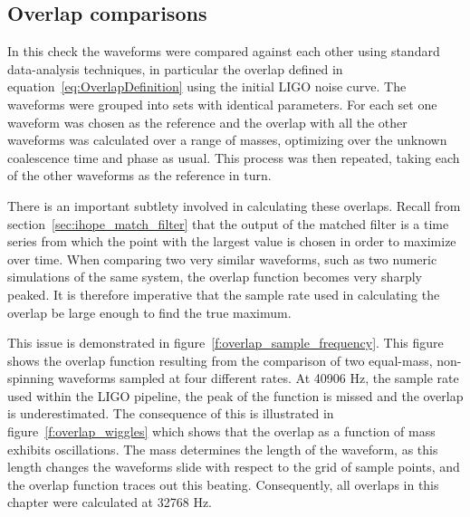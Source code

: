 \subsection{Overlap comparisons}
\label{ssec:ninja2_overlap_comparisons}

In this check the waveforms were compared against each other using
standard data-analysis techniques, in particular the overlap defined
in equation~\ref{eq:OverlapDefinition}  using the initial LIGO noise
curve.  The waveforms were grouped into sets with identical
parameters.  For each set one waveform was chosen as the reference and
the overlap with all the other waveforms was calculated over a range of
masses, optimizing over the unknown coalescence time and phase as
usual.  This process was then repeated, taking each of the other
waveforms as the reference in turn.

There is an important subtlety involved in calculating these overlaps.
Recall from section~\ref{sec:ihope_match_filter} that the output of
the matched filter is a time series from which the point with the
largest value is chosen in order to maximize over time.  When
comparing two very similar waveforms, such as two numeric simulations
of the same system, the overlap function becomes very sharply peaked.
It is therefore imperative that the sample rate used in calculating 
the overlap be large enough to find the true maximum.

This issue is demonstrated in figure~\ref{f:overlap_sample_frequency}.
This figure shows the overlap function resulting from the comparison
of two equal-mass, non-spinning waveforms sampled at four different
rates.  At 40906 Hz, the sample rate used within the LIGO pipeline,
the peak of the function is missed and the overlap is underestimated.
The consequence of this is illustrated in
figure~\ref{f:overlap_wiggles} which shows that the overlap as a
function of mass exhibits oscillations.  The mass determines the length
of the waveform, as this length changes the waveforms slide with
respect to the grid of sample points, and the overlap function traces
out this beating.  Consequently, all overlaps in this chapter were
calculated at 32768 Hz.

